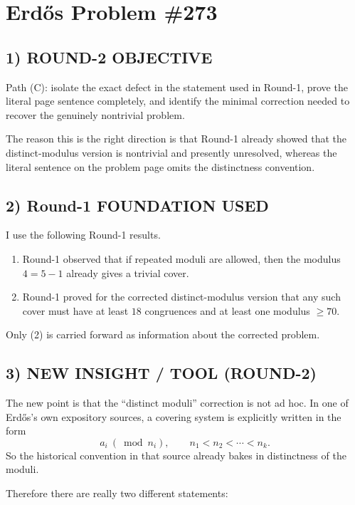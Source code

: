 \section*{Erd\H{o}s Problem \#273}

\subsection*{1) ROUND-2 OBJECTIVE}

Path (C): isolate the exact defect in the statement used in Round-1, prove the literal page sentence completely, and identify the minimal correction needed to recover the genuinely nontrivial problem.

The reason this is the right direction is that Round-1 already showed that the distinct-modulus version is nontrivial and presently unresolved, whereas the literal sentence on the problem page omits the distinctness convention.

\subsection*{2) Round-1 FOUNDATION USED}

I use the following Round-1 results.

\begin{enumerate}
\item Round-1 observed that if repeated moduli are allowed, then the modulus $4=5-1$ already gives a trivial cover.
\item Round-1 proved for the corrected distinct-modulus version that any such cover must have at least $18$ congruences and at least one modulus $\ge 70$.
\end{enumerate}

Only (2) is carried forward as information about the corrected problem.

\subsection*{3) NEW INSIGHT / TOOL (ROUND-2)}

The new point is that the ``distinct moduli'' correction is not ad hoc.  In one of Erd\H{o}s's own expository sources, a covering system is explicitly written in the form
\[
a_i \ (\bmod n_i), \qquad n_1<n_2<\cdots<n_k.
\]
So the historical convention in that source already bakes in distinctness of the moduli.

Therefore there are really two different statements:

